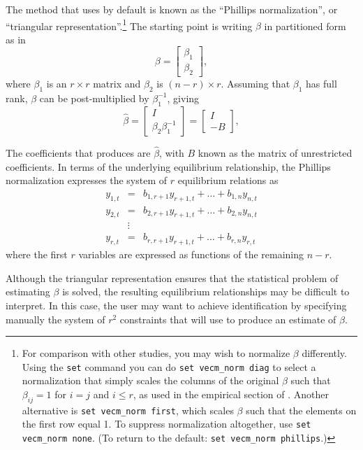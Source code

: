 The method that  uses by default is known as the ``Phillips
normalization'', or ``triangular representation''.\footnote{For
  comparison with other studies, you may wish to normalize $\beta$
  differently.  Using the \texttt{set} command you can do
  \verb|set vecm_norm diag| to select a normalization that simply
  scales the columns of the original $\beta$ such that $\beta_{ij} =
  1$ for $i=j$ and $i \leq r$, as used in the empirical section of
  \cite{boswijk-doornik04}.  Another alternative is
  \verb+set vecm_norm first+, which scales $\beta$ such that the
  elements on the first row equal 1.  To suppress normalization
  altogether, use \verb+set vecm_norm none+.  (To return to the
  default: \texttt{set vecm\_norm phillips}.)} The starting point is
writing $\beta$ in partitioned form as in
\[
  \beta = \left[
    \begin{array}{c} \beta_1 \\ \beta_2  \end{array}
    \right] ,
\]
where $\beta_1$ is an $r \times r$ matrix and  $\beta_2$ is $(n-r)
\times r$. Assuming that $\beta_1$ has full rank, $\beta$ can be
post-multiplied by $\beta_1^{-1}$, giving
\[
  \hat{\beta} = \left[
    \begin{array}{c} I \\ \beta_2 \beta_1^{-1}  \end{array}
    \right] =
    \left[
    \begin{array}{c} I \\ -B \end{array}
  \right]  ,
\]

The coefficients that  produces are $\hat{\beta}$, with
$B$ known as the matrix of unrestricted coefficients. In
terms of the underlying equilibrium relationship, the Phillips
normalization expresses the system of $r$ equilibrium relations as
  \begin{eqnarray*}
    y_{1,t} & = & b_{1,r+1} y_{r+1,t} + \ldots + b_{1,n} y_{n,t} \\
    y_{2,t} & = & b_{2,r+1} y_{r+1,t} + \ldots + b_{2,n} y_{n,t} \\
    & \vdots & \\
    y_{r,t} & = & b_{r,r+1} y_{r+1,t} + \ldots + b_{r,n} y_{r,t} 
  \end{eqnarray*}
where the first $r$ variables are expressed as functions of the
remaining $n-r$.

Although the triangular representation ensures that the statistical
problem of estimating $\beta$ is solved, the resulting equilibrium
relationships may be difficult to interpret. In this case, the user
may want to achieve identification by specifying manually the system
of $r^2$ constraints that  will use to produce an estimate
of $\beta$.

